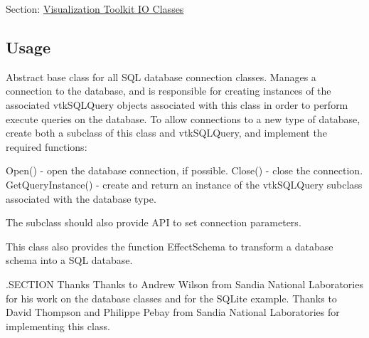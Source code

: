 Section\-: \hyperlink{sec_vtkio}{Visualization Toolkit I\-O Classes} \hypertarget{vtkwidgets_vtkxyplotwidget_Usage}{}\subsection{Usage}\label{vtkwidgets_vtkxyplotwidget_Usage}
Abstract base class for all S\-Q\-L database connection classes. Manages a connection to the database, and is responsible for creating instances of the associated vtk\-S\-Q\-L\-Query objects associated with this class in order to perform execute queries on the database. To allow connections to a new type of database, create both a subclass of this class and vtk\-S\-Q\-L\-Query, and implement the required functions\-:

Open() -\/ open the database connection, if possible. Close() -\/ close the connection. Get\-Query\-Instance() -\/ create and return an instance of the vtk\-S\-Q\-L\-Query subclass associated with the database type.

The subclass should also provide A\-P\-I to set connection parameters.

This class also provides the function Effect\-Schema to transform a database schema into a S\-Q\-L database.

.S\-E\-C\-T\-I\-O\-N Thanks Thanks to Andrew Wilson from Sandia National Laboratories for his work on the database classes and for the S\-Q\-Lite example. Thanks to David Thompson and Philippe Pebay from Sandia National Laboratories for implementing this class.

